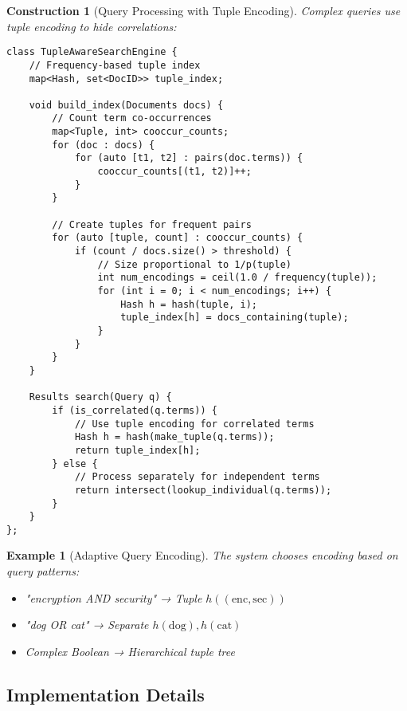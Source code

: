 \documentclass[11pt,final,hidelinks]{article}
\newtheorem{example}[theorem]{Example}
\newtheorem{construction}[theorem]{Construction}
\begin{document}
\begin{construction}[Query Processing with Tuple Encoding]
Complex queries use tuple encoding to hide correlations:
\begin{verbatim}
class TupleAwareSearchEngine {
    // Frequency-based tuple index
    map<Hash, set<DocID>> tuple_index;
    
    void build_index(Documents docs) {
        // Count term co-occurrences
        map<Tuple, int> cooccur_counts;
        for (doc : docs) {
            for (auto [t1, t2] : pairs(doc.terms)) {
                cooccur_counts[(t1, t2)]++;
            }
        }
        
        // Create tuples for frequent pairs
        for (auto [tuple, count] : cooccur_counts) {
            if (count / docs.size() > threshold) {
                // Size proportional to 1/p(tuple)
                int num_encodings = ceil(1.0 / frequency(tuple));
                for (int i = 0; i < num_encodings; i++) {
                    Hash h = hash(tuple, i);
                    tuple_index[h] = docs_containing(tuple);
                }
            }
        }
    }
    
    Results search(Query q) {
        if (is_correlated(q.terms)) {
            // Use tuple encoding for correlated terms
            Hash h = hash(make_tuple(q.terms));
            return tuple_index[h];
        } else {
            // Process separately for independent terms
            return intersect(lookup_individual(q.terms));
        }
    }
};
\end{verbatim}
\end{construction}

\begin{example}[Adaptive Query Encoding]
The system chooses encoding based on query patterns:
\begin{itemize}
    \item "encryption AND security" → Tuple $h((\text{enc}, \text{sec}))$
    \item "dog OR cat" → Separate $h(\text{dog}), h(\text{cat})$
    \item Complex Boolean → Hierarchical tuple tree
\end{itemize}
\end{example}

\subsection{Implementation Details}
\end{document}
